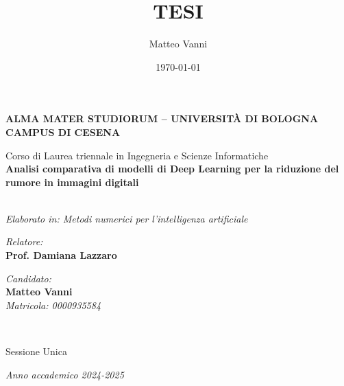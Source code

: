 \title{TESI}
\author{Matteo Vanni}
\date{\today}
 
\begin{titlepage}
\begin{center}
 
    \large
    \textbf{ALMA MATER STUDIORUM -- UNIVERSITÀ DI BOLOGNA\\CAMPUS DI CESENA}
\\
    \noindent\hrulefill
    \vspace{0.4cm}
 
    \Large
    Corso di Laurea triennale in Ingegneria e Scienze Informatiche\\
 
    \Huge
    \vspace{4.5cm}
    \Large
    \textbf{
        Analisi comparativa di modelli di Deep Learning per la riduzione del rumore in immagini digitali}
 
    \large
    \noindent\hrulefill\\
    \textit{Elaborato in: Metodi numerici per l'intelligenza artificiale}
    \vspace{1cm}
 
    \vspace{5.5cm}
    \begin{minipage}[t]{0.64\textwidth}
      \begin{flushleft}
        \textit{Relatore:}\\
        \textbf{Prof. Damiana Lazzaro}
      \end{flushleft}
    \end{minipage}
    \begin{minipage}[t]{0.34\textwidth}
      
      \begin{flushright}
        \textit{Candidato:}\\
        \textbf{Matteo Vanni}
\\
        \textit{Matricola: 0000935584}
      \end{flushright}

    \end{minipage}\\
 

    \vfill
    \begin{center}
      Sessione Unica
    \end{center}
    \noindent\hrulefill

    \textit{Anno accademico 2024-2025}
    \vspace{0.3cm}
    \Large
 
  \end{center}
\end{titlepage}
 
